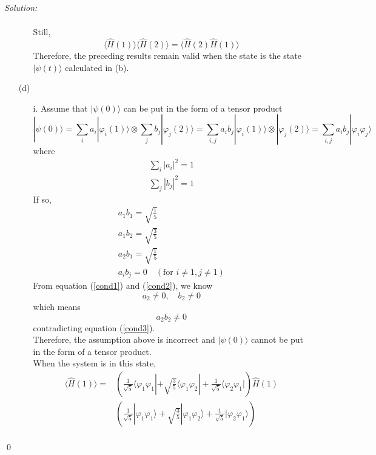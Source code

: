 \documentclass[12pt,a4paper]{article}
\newenvironment{sol}
    {\emph{Solution:}
    }
    {
    \qed
    }
\begin{document}
\begin{sol}
\begin{itemize}
\begin{itemize}
\begin{align}
\end{align}\normalsize
Still,
\begin{equation}
\langle\hat{H}(1)\rangle\langle\hat{H}(2)\rangle=\langle\hat{H}(2)\hat{H}(1)\rangle
\end{equation}
Therefore, the preceding results remain valid when the state is the state $|\psi(t)\rangle$ calculated in (b).
\end{itemize}
\item[(d)]
\begin{itemize}
\item[i.] Assume that $|\psi(0)\rangle$ can be put in the form of a tensor product
\begin{equation}
|\psi(0)\rangle=\sum_ia_i|\varphi_i(1)\rangle\otimes\sum_jb_j|\varphi_j(2)\rangle=\sum_{i,j}a_ib_j|\varphi_i(1)\rangle\otimes|\varphi_j(2)\rangle=\sum_{i,j}a_ib_j|\varphi_i\varphi_j\rangle
\end{equation}
where
\begin{gather}
\sum_i|a_i|^2=1\\
\sum_j|b_j|^2=1
\end{gather}
If so,
\begin{gather}
a_1b_1=\sqrt{\frac{1}{5}}\\
\label{cond1}a_1b_2=\sqrt{\frac{3}{5}}\\
\label{cond2}a_2b_1=\sqrt{\frac{1}{5}}\\
\label{cond3}a_ib_j=0\quad(\text{for }i\neq1,j\neq1)
\end{gather}
From equation (\ref{cond1}) and (\ref{cond2}), we know
\begin{equation}
a_2\neq0,\quad b_2\neq0
\end{equation}
which means
\begin{equation}
a_2b_2\neq0
\end{equation}
contradicting equation (\ref{cond3}).\\
Therefore, the assumption above is incorrect and $|\psi(0)\rangle$ cannot be put in the form of a tensor product.\\
When the system is in this state,
\begin{align}
\nonumber\langle\hat{H}(1)\rangle=&\left(\frac{1}{\sqrt{5}}\langle\varphi_1\varphi_1|+\sqrt{\frac{3}{5}}\langle\varphi_1\varphi_2|+\frac{1}{\sqrt{5}}\langle\varphi_2\varphi_1|\right)\hat{H}(1)\\
\nonumber&\left(\frac{1}{\sqrt{5}}|\varphi_1\varphi_1\rangle+\sqrt{\frac{3}{5}}|\varphi_1\varphi_2\rangle+\frac{1}{\sqrt{5}}|\varphi_2\varphi_1\rangle\right)\\

\end{align}
\end{itemize}
\end{itemize}
\end{sol}
\end{document}
